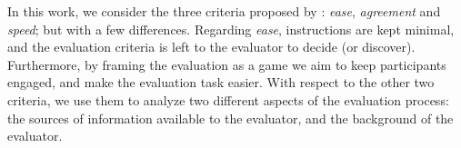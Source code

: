 In this work, we consider the three criteria proposed by : \emph{ease}, \emph{agreement} and \emph{speed}; but with a few differences. Regarding \emph{ease}, instructions are kept minimal, and the evaluation criteria is left to the evaluator to decide (or discover). Furthermore, by framing the evaluation as a game we aim to keep participants engaged, and make the evaluation task easier. %
With respect to the other two criteria, we use them to analyze two different aspects of the evaluation process: the sources of information available to the evaluator, and the background of the evaluator. 






